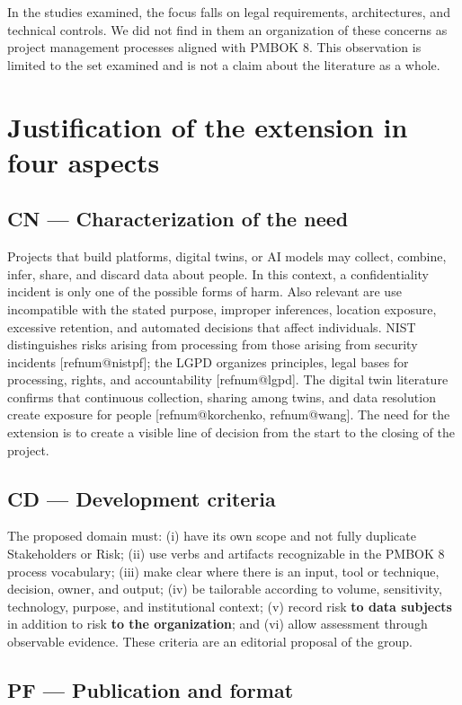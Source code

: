 \documentclass[11pt,a4paper]{article}
\makeatletter
\newcommand{\refnum}[1]{\csname refnum@#1\endcsname}
\makeatother
\begin{document}
In the studies examined, the focus falls on legal requirements, architectures, and technical controls. We did not find in them an organization of these concerns as project management processes aligned with PMBOK 8. This observation is limited to the set examined and is not a claim about the literature as a whole.

\section{Justification of the extension in four aspects}
\subsection{CN — Characterization of the need}

Projects that build platforms, digital twins, or AI models may collect, combine, infer, share, and discard data about people. In this context, a confidentiality incident is only one of the possible forms of harm. Also relevant are use incompatible with the stated purpose, improper inferences, location exposure, excessive retention, and automated decisions that affect individuals. NIST distinguishes risks arising from processing from those arising from security incidents [\refnum{nistpf}]; the LGPD organizes principles, legal bases for processing, rights, and accountability [\refnum{lgpd}]. The digital twin literature confirms that continuous collection, sharing among twins, and data resolution create exposure for people [\refnum{korchenko}, \refnum{wang}]. The need for the extension is to create a visible line of decision from the start to the closing of the project.
\subsection{CD — Development criteria}

The proposed domain must: (i) have its own scope and not fully duplicate Stakeholders or Risk; (ii) use verbs and artifacts recognizable in the PMBOK 8 process vocabulary; (iii) make clear where there is an input, tool or technique, decision, owner, and output; (iv) be tailorable according to volume, sensitivity, technology, purpose, and institutional context; (v) record risk \textbf{to data subjects} in addition to risk \textbf{to the organization}; and (vi) allow assessment through observable evidence. These criteria are an editorial proposal of the group.
\subsection{PF — Publication and format}
\end{document}
